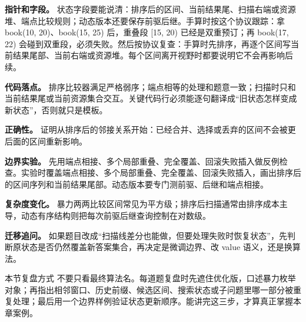 \textbf{指针和字段。} 状态字段要能说清：排序后的区间、当前结果尾、扫描右端或资源堆、端点比较规则；动态版本还要保存前驱后继。手算时按这个协议跟踪：拿 book(10, 20)、book(15, 25) 后，重叠段 [15, 20) 已经是双重预订；再 book(17, 22) 会碰到双重段，必须失败。然后按协议复查：手算时先排序，再逐个区间写当前结果尾部、当前右端或资源堆。每个区间离开视野时都要说明它不会再影响后续。

\textbf{代码落点。} 排序比较器满足严格弱序；端点相等的处理和题意一致；扫描时只和当前结果尾或当前资源集合交互。关键代码行必须能逐句翻译成“旧状态怎样变成新状态”，否则就只是模板。

\textbf{正确性。} 证明从排序后的邻接关系开始：已经合并、选择或丢弃的区间不会被更后面的区间重新影响。

\textbf{边界实验。} 先用端点相接、多个局部重叠、完全覆盖、回滚失败插入做反例检查。实验时覆盖端点相接、多个局部重叠、完全覆盖、回滚失败插入，画出排序后的区间序列和当前结果尾部。动态版本要专门测前驱、后继和端点相接。

\textbf{复杂度变化。} 暴力两两比较区间常见为平方级；排序后扫描通常由排序成本主导，动态有序结构则把每次前驱后继查询控制在对数级。

\textbf{迁移追问。} 如果题目改成“扫描线差分也能做，但要处理失败时恢复状态”，先判断原状态是否仍然覆盖新答案集合，再决定是微调边界、改 value 语义，还是换算法。

\begin{principlebox}{本节复盘方式}
不要只看最终算法名。每道题复盘时先遮住优化版，口述暴力枚举对象；再指出相邻窗口、历史前缀、候选区间、搜索状态或子问题里哪一部分被重复处理；最后用一个边界样例验证状态更新顺序。能讲完这三步，才算真正掌握本章案例。
\end{principlebox}
